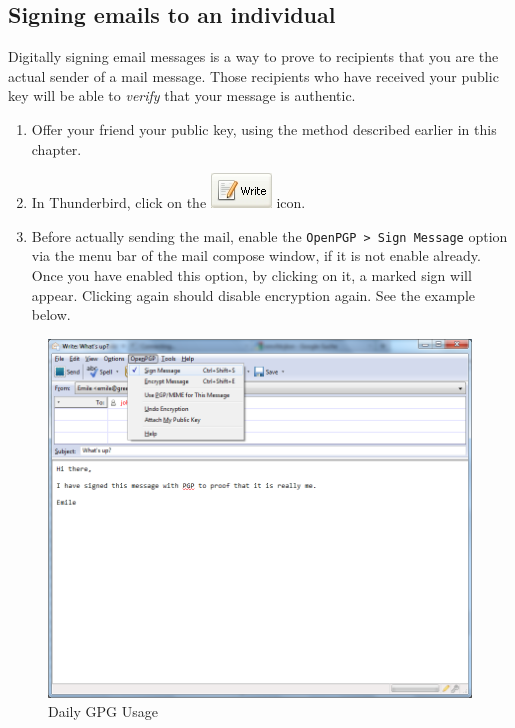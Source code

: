 \subsection{Signing emails to an individual}

Digitally signing email messages is a way to prove to recipients that
you are the actual sender of a mail message. Those recipients who have
received your public key will be able to \emph{verify} that your message
is authentic.

\begin{enumerate}[1.]
\item
  Offer your friend your public key, using the method described earlier
  in this chapter.
\item
  In Thunderbird, click on the \includegraphics{gpg_write.png} icon.
\item
  Before actually sending the mail, enable the
  \verb!OpenPGP > Sign Message! option via the menu bar of the mail
  compose window, if it is not enable already. Once you have enabled
  this option, by clicking on it, a marked sign will appear. Clicking
  again should disable encryption again. See the example below.
\end{enumerate}
\begin{figure}[htbp]
\centering
\includegraphics{daily_gpg_21.png}
\caption{Daily GPG Usage}
\end{figure}

